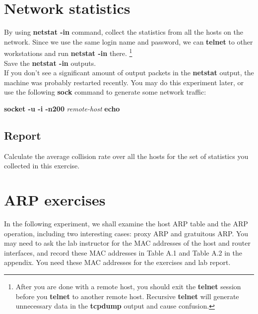 \documentclass[10pt,a4paper]{article}
\numberwithin{equation}{section}
\numberwithin{figure}{section}
\numberwithin{table}{section}
\begin{document}
\section{Network statistics}
    By using \textbf{netstat -in} command, collect the statistics from all the hosts on the network.
    Since we use the same login name and password, we can \textbf{telnet} to other workstations and run \textbf{netstat -in} there. \footnote{After you are done with a remote host, you should exit the \textbf{telnet} session before you \textbf{telnet} to another remote host.
    Recursive \textbf{telnet} will generate unnecessary data in the \textbf{tcpdump} output and cause confusion.} \\
    Save the \textbf{netstat -in} outputs. \\
    If you don’t see a significant amount of output packets in the \textbf{netstat} output, the machine was probably restarted recently. You may do this experiment later, or use the following \textbf{sock} command to generate some network traffic: \\
    \centerline{\textbf{socket -u -i -n200} \textit{remote-host} \textbf{echo}}
    \subsection*{Report}
    Calculate the average collision rate over all the hosts for the set of statistics you collected in this exercise.

\section*{ARP exercises}
    In the following experiment, we shall examine the host ARP table and the ARP operation, including two interesting cases: proxy ARP and gratuitous ARP. You may need to ask the lab instructor for the MAC addresses of the host and router interfaces, and record these MAC addresses in Table A.1 and Table A.2 in the appendix.
    You need these MAC addresses for the exercises and lab report.
\end{document}
